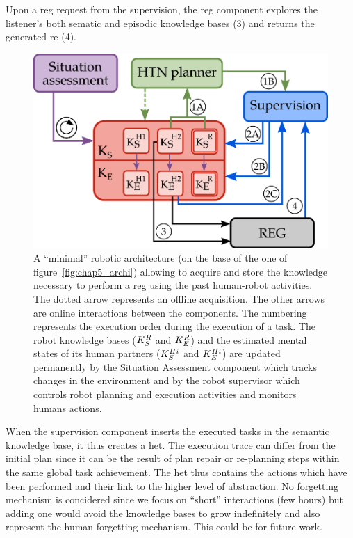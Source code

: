 Upon a \acrshort{reg} request from the supervision, the \acrshort{reg} component explores the listener's both sematic and episodic knowledge bases (3) and returns the generated \acrshort{re} (4).

\begin{figure}[h!]
\centering
\includegraphics[scale=0.35]{figures/chapter6/architecture.png}
\caption{\label{fig:chap6_architecture} A ``minimal'' robotic architecture (on the base of the one of figure~\ref{fig:chap5_archi}) allowing to acquire and store the knowledge necessary to perform a \acrshort{reg} using the past human-robot activities. The dotted arrow represents an offline acquisition. The other arrows are online interactions between the components. The numbering represents the execution order during the execution of a task.
The robot knowledge bases ($K_S^{R}$ and $K_E^{R}$) and the estimated mental states of its human partners ($K_S^{Hi}$ and $K_E^{Hi}$) are updated permanently by the Situation Assessment component which tracks changes in the environment and by the robot supervisor which controls robot planning and execution activities and monitors humans actions.}
\end{figure}

When the supervision component inserts the executed tasks in the semantic knowledge base, it thus creates a \acrfull{het}. The execution trace can differ from the initial plan since it can be the result of plan repair or re-planning steps within the same global task achievement. The \acrshort{het} thus contains the actions which have been performed and their link to the higher level of abstraction. No forgetting mechanism is concidered since we focus on ``short'' interactions (few hours) but adding one would avoid the knowledge bases to grow indefinitely and also represent the human forgetting mechanism. This could be for future work.

